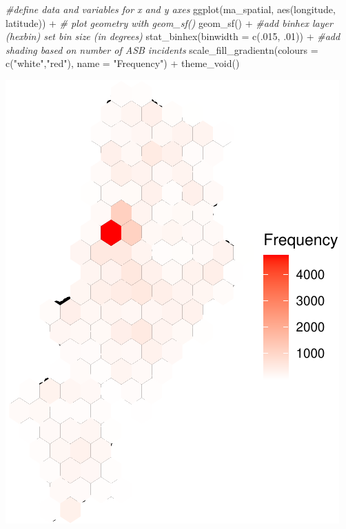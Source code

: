 \documentclass[
]{book}
\makeatletter
\newenvironment{Shaded}{\begin{snugshade}}{\end{snugshade}}
\newcommand{\AttributeTok}[1]{\textcolor[rgb]{0.61,0.61,0.61}{#1}}
\newcommand{\CommentTok}[1]{\textcolor[rgb]{0.37,0.37,0.37}{\textit{#1}}}
\newcommand{\DecValTok}[1]{\textcolor[rgb]{0.06,0.06,0.06}{#1}}
\newcommand{\FunctionTok}[1]{\textcolor[rgb]{0,0,0}{#1}}
\newcommand{\NormalTok}[1]{#1}
\newcommand{\SpecialCharTok}[1]{\textcolor[rgb]{0,0,0}{#1}}
\newcommand{\StringTok}[1]{\textcolor[rgb]{0.5,0.5,0.5}{#1}}
\newenvironment{kframe}{%
\medskip{}
\setlength{\fboxsep}{.8em}
 \def\at@end@of@kframe{}%
 \ifinner\ifhmode%
  \def\at@end@of@kframe{\end{minipage}}%
  \begin{minipage}{\columnwidth}%
 \fi\fi%
 \def\FrameCommand##1{\hskip\@totalleftmargin \hskip-\fboxsep
 \colorbox{shadecolor}{##1}\hskip-\fboxsep
     \hskip-\linewidth \hskip-\@totalleftmargin \hskip\columnwidth}%
 \MakeFramed {\advance\hsize-\width
   \@totalleftmargin\z@ \linewidth\hsize
   \@setminipage}}%
 {\par\unskip\endMakeFramed%
 \at@end@of@kframe}
\renewenvironment{Shaded}{\begin{kframe}}{\end{kframe}}
\makeatother
\begin{document}
\begin{Shaded}
\begin{Highlighting}[]
\CommentTok{\#define data and variables for x and y axes}
\FunctionTok{ggplot}\NormalTok{(ma\_spatial, }\FunctionTok{aes}\NormalTok{(longitude, latitude)) }\SpecialCharTok{+} 
  \CommentTok{\# plot geometry with geom\_sf()}
  \FunctionTok{geom\_sf}\NormalTok{() }\SpecialCharTok{+} 
  \CommentTok{\#add binhex layer (hexbin) set bin size (in degrees)}
  \FunctionTok{stat\_binhex}\NormalTok{(}\AttributeTok{binwidth =} \FunctionTok{c}\NormalTok{(.}\DecValTok{015}\NormalTok{, .}\DecValTok{01}\NormalTok{)) }\SpecialCharTok{+}
  \CommentTok{\#add shading based on number of ASB incidents}
  \FunctionTok{scale\_fill\_gradientn}\NormalTok{(}\AttributeTok{colours =} \FunctionTok{c}\NormalTok{(}\StringTok{"white"}\NormalTok{,}\StringTok{"red"}\NormalTok{), }
                       \AttributeTok{name =} \StringTok{"Frequency"}\NormalTok{)  }\SpecialCharTok{+} 
  \FunctionTok{theme\_void}\NormalTok{() }
\end{Highlighting}
\end{Shaded}

\includegraphics{crime_mapping_files/figure-latex/unnamed-chunk-125-1.pdf}
\end{document}
